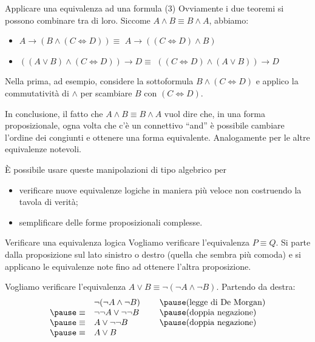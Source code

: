 \documentclass[10pt,dvipsnames]{beamer}
\begin{document}
\begin{frame}{Applicare una equivalenza ad una formula (3)}
    Ovviamente i due teoremi si possono combinare tra di loro. Siccome $A \wedge B \equiv B \wedge A$, abbiamo:
    \begin{itemize}
        \item $A \to (B \wedge (C \iff D))  \equiv$ \pause $A \to ((C \iff D) \wedge B)$ \pause
        \item $((A \vee B) \wedge (C \iff D)) \to D \equiv$ \pause $( (C \iff D) \wedge (A \vee B)) \to D$
    \end{itemize}

    \pause\medskip
    Nella prima, ad esempio, considere la sottoformula $B \wedge (C \iff D)$ e applico la commutatività di $\wedge$ per scambiare $B$ con $(C \iff D)$.

    \pause\medskip
    In conclusione, il fatto che $A \wedge B \equiv B \wedge A$ vuol dire che, in una forma proposizionale, ogna volta che c'è un connettivo ``and'' è possibile cambiare l'ordine dei congiunti e ottenere una forma equivalente. Analogamente per le altre equivalenze notevoli.

    \medskip
    È possibile usare queste manipolazioni di tipo algebrico per
    \begin{itemize}
        \item verificare nuove equivalenze logiche in maniera più veloce non costruendo la tavola di verità;
        \item semplificare delle forme proposizionali complesse.
    \end{itemize}
\end{frame}

\begin{frame}{Verificare una equivalenza logica}
    Vogliamo verificare l'equivalenza $P \equiv Q$.  Si parte dalla proposizione sul lato sinistro o destro (quella che sembra più comoda) e si applicano le equivalenze note fino ad ottenere l'altra proposizione.

    \begin{example}
        Vogliamo verificare l'equivalenza $A \vee B \equiv \neg(\neg A \wedge \neg B)$. Partendo da destra:
        \[
            \begin{array}{rl@{\hspace{0.8cm}}l}
                              & \neg(\neg A \wedge \neg B) & \pause \text{(legge di De Morgan)} \\
                \pause \equiv & \neg\neg A \vee \neg\neg B & \pause \text{(doppia negazione)}   \\
                \pause \equiv & A \vee \neg\neg B          & \pause \text{(doppia negazione)}   \\
                \pause \equiv & A \vee B
            \end{array}
        \]
    \end{example}
\end{frame}
\end{document}
